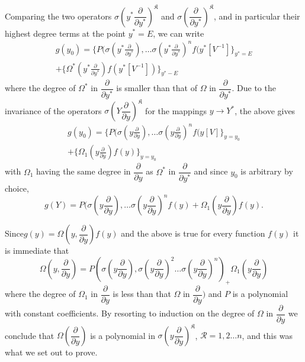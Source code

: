 Comparing the two operators $\sigma (y^* \dfrac{\partial}{\partial
  y^*})^{\mathfrak{K}}$ and $\sigma (\dfrac{\partial}{\partial
  y^*})^\mathfrak{K}$, and in \break particular their highest degree terms at
the point $y^* = E$, we can write 
\begin{gather*}
g(y_0) = \{ P(\sigma(y^* \frac{\partial}{\partial y^*}), \ldots
\sigma(y^* \frac{\partial}{\partial y^*})^n f (y^* [V^{-1}] \}_{y^* =
  E} \\ 
+ \{ \Omega^* (y^* \frac{\partial}{\partial y^*}) f (y^* [V^{-1}])
\}_{y^*- E} 
\end{gather*}
where the degree of $\Omega^*$ in $\dfrac{\partial}{\partial y^*}$ is
smaller than that of $\Omega$ in $\dfrac{\partial}{\partial y^*}$. Due
to the invariance of the operators $\sigma(Y \dfrac{\partial}{\partial
  y})^{\mathfrak{K}}$ for the mappings $y \rightarrow Y^*$, the above
gives  
\begin{gather*}
g(y_0) = \{ P(\sigma(y \frac{\partial}{\partial y}), \ldots \sigma(y
\frac{\partial}{\partial y})^n f (y [V] \}_{y = y_0} \\ 
+ \{ \Omega_1 (y \frac{\partial}{\partial y}) f (y) \}_{y = y_0} 
\end{gather*}
with $\Omega_1$ having the same degree in $\dfrac{\partial}{\partial
  y}$ as $\Omega^*$ in $\dfrac{\partial}{\partial y^*}$ and since
$y_0$ is  arbitrary by choice, 
$$
g(Y) = P(\sigma(y \frac{\partial}{\partial y}), \ldots \sigma(y
\frac{\partial}{\partial y})^n f (y) + \Omega_1 (y
\frac{\partial}{\partial y}) f (y). 
$$

Since\pageoriginale $g(y) = \Omega (y , \dfrac{\partial}{\partial y})
f(y)$ and the above is true for every function $f(y)$ it is immediate
that   
$$
\Omega (y , \frac{\partial}{\partial y}) = P(\sigma
(y\frac{\partial}{\partial y}), \sigma (y \frac{\partial}{\partial
  y})^2 \ldots \sigma(y \frac{\partial}{\partial y})^n) _+\Omega_1 (y
\frac{\partial}{\partial y}) 
$$
where the degree of $\Omega_1$ in $\dfrac{\partial}{\partial y}$ is
less than that $\Omega$ in $\dfrac{\partial}{\partial y})$ and $P$ is
a polynomial with constant coefficients. By resorting to induction on
the degree of $\Omega$ in $\dfrac{\partial}{\partial y}$ we conclude
that  $\Omega (\dfrac{\partial}{\partial y})$ is a polynomial in
\; $\sigma(y \dfrac{\partial}{\partial y})^\mathfrak{K}$, \; $\mathscr{R} = 1,2
\ldots n$, and this was what we set out to prove. 

